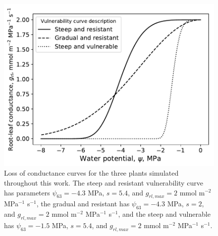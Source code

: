 \documentclass[utf8]{frontiersSCNS} %
\begin{document}
\begin{figure}[h]
    \begin{center}
         \includegraphics[scale=0.75]{grl.pdf}   
    \end{center}
    \caption{Loss of conductance curves for the three plants simulated throughout this work. The steep and resistant vulnerability curve has parameters $\psi_{63} = -4.3$ MPa, $s=5.4$, and $g_{rl,max} = 2$ mmol m$^{-2}$ MPa$^{-1}$ s$^{-1}$, the gradual and resistant has $\psi_{63} = -4.3$ MPa, $s=2$, and $g_{rl,max} = 2$ mmol m$^{-2}$ MPa$^{-1}$ s$^{-1}$, and the steep and vulnerable has $\psi_{63} = -1.5$ MPa, $s=5.4$, and $g_{rl,max} = 2$ mmol m$^{-2}$ MPa$^{-1}$ s$^{-1}$.}
    \label{fig:grl}
\end{figure}
\end{document}
